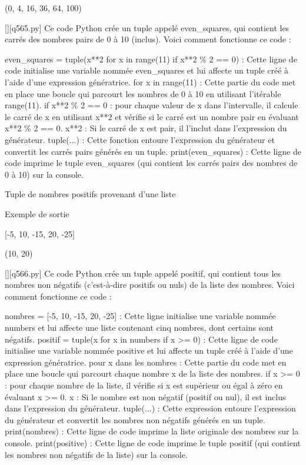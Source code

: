 (0, 4, 16, 36, 64, 100)
        \par
        \begin{solution}
            \renewcommand{\nomfichier}{q565.py}
            \pythonfile{\chemincode \nomfichier}[][\nomfichier]
            Ce code Python crée un tuple appelé even\_squares, qui contient les carrés des nombres pairs de 0 à 10 (inclus). Voici comment fonctionne ce code :

    even\_squares = tuple(x**2 for x in range(11) if x**2 \% 2 == 0) : Cette ligne de code initialise une variable nommée even\_squares et lui affecte un tuple créé à l'aide d'une expression génératrice.
        for x in range(11) : Cette partie du code met en place une boucle qui parcourt les nombres de 0 à 10 en utilisant l'itérable range(11).
        if x**2 \% 2 == 0 : pour chaque valeur de x dans l'intervalle, il calcule le carré de x en utilisant x**2 et vérifie si le carré est un nombre pair en évaluant x**2 \% 2 == 0.
        x**2 : Si le carré de x est pair, il l'inclut dans l'expression du générateur.
        tuple(...) : Cette fonction entoure l'expression du générateur et convertit les carrés pairs générés en un tuple.
    print(even\_squares) : Cette ligne de code imprime le tuple even\_squares (qui contient les carrés pairs des nombres de 0 à 10) sur la console.
        \end{solution}
        

        \question
        Tuple de nombres positifs provenant d'une liste

Exemple de sortie

[-5, 10, -15, 20, -25]

(10, 20)
        \par
        \begin{solution}
            \renewcommand{\nomfichier}{q566.py}
            \pythonfile{\chemincode \nomfichier}[][\nomfichier]
            Ce code Python crée un tuple appelé positif, qui contient tous les nombres non négatifs (c'est-à-dire positifs ou nuls) de la liste des nombres. Voici comment fonctionne ce code :

    nombres = [-5, 10, -15, 20, -25] : Cette ligne initialise une variable nommée numbers et lui affecte une liste contenant cinq nombres, dont certains sont négatifs.
    positif = tuple(x for x in numbers if x >= 0) : Cette ligne de code initialise une variable nommée positive et lui affecte un tuple créé à l'aide d'une expression génératrice.
        pour x dans les nombres : Cette partie du code met en place une boucle qui parcourt chaque nombre x de la liste des nombres.
        if x >= 0 : pour chaque nombre de la liste, il vérifie si x est supérieur ou égal à zéro en évaluant x >= 0.
        x : Si le nombre est non négatif (positif ou nul), il est inclus dans l'expression du générateur.
        tuple(...) : Cette expression entoure l'expression du générateur et convertit les nombres non négatifs générés en un tuple.
    print(nombres) : Cette ligne de code imprime la liste originale des nombres sur la console.
    print(positive) : Cette ligne de code imprime le tuple positif (qui contient les nombres non négatifs de la liste) sur la console.
        \end{solution}
        


